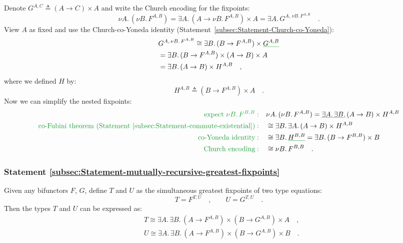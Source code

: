 Denote $G^{A,C}\triangleq(A\rightarrow C)\times A$ and write the
Church encoding for the fixpoints:
\[
\nu A.\,(\nu B.\,F^{A,B})=\exists A.\,(A\rightarrow\nu B.\,F^{A,B})\times A=\exists A.\,G^{A,\,\nu B.\,F^{A,B}}\quad.
\]
View $A$ as fixed and use the Church-co-Yoneda identity (Statement~\ref{subsec:Statement-Church-co-Yoneda}):
\begin{align*}
 & G^{A,\,\nu B.\,F^{A,B}}\cong\exists B.\,(B\rightarrow F^{A,B})\times\gunderline{G^{A,B}}\\
 & =\exists B.\,(B\rightarrow F^{A,B})\times(A\rightarrow B)\times A\\
 & =\exists B.\,(A\rightarrow B)\times H^{A,B}\quad,
\end{align*}
where we defined $H$ by: 
\[
H^{A,B}\triangleq(B\rightarrow F^{A,B})\times A\quad.
\]
Now we can simplify the nested fixpoints:
\begin{align*}
{\color{greenunder}\text{expect }\nu B.\,F^{B,B}:}\quad & \nu A.\,(\nu B.\,F^{A,B})=\gunderline{\exists A.\,\exists B.}\,(A\rightarrow B)\times H^{A,B}\\
{\color{greenunder}\text{co-Fubini theorem (Statement~\ref{subsec:Statement-commute-existential})}:}\quad & \cong\exists B.\,\exists A.\,(A\rightarrow B)\times H^{A,B}\\
{\color{greenunder}\text{co-Yoneda identity}:}\quad & \cong\exists B.\,\gunderline{H^{B,B}}=\exists B.\,(B\rightarrow F^{B,B})\times B\\
{\color{greenunder}\text{Church encoding}:}\quad & \cong\nu B.\,F^{B,B}\quad.
\end{align*}


\subsubsection{Statement \label{subsec:Statement-mutually-recursive-greatest-fixpoints}\ref{subsec:Statement-mutually-recursive-greatest-fixpoints}}

Given any bifunctors $F$, $G$, define $T$ and $U$ as the simultaneous
greatest fixpoints of two type equations:
\[
T=F^{T,U}\quad,\quad\quad U=G^{T,U}\quad.
\]
Then the types $T$ and $U$ can be expressed as:
\begin{align*}
 & T\cong\exists A.\,\exists B.\,(A\rightarrow F^{A,B})\times(B\rightarrow G^{A,B})\times A\quad,\\
 & U\cong\exists A.\,\exists B.\,(A\rightarrow F^{A,B})\times(B\rightarrow G^{A,B})\times B\quad.
\end{align*}


